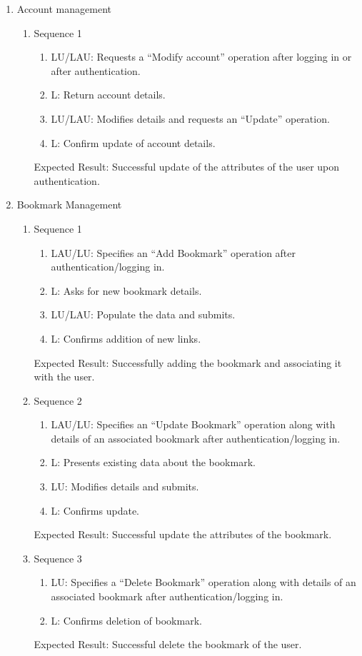 \documentclass[11pt]{report} %
\begin{document}
\begin{enumerate}
\item
	Account management
		\begin{enumerate}
			\item
				Sequence 1
					\begin{enumerate}
						\item
							LU/LAU: Requests a “Modify account” operation after logging in or after authentication.
						\item
							L: Return account details.
						\item
							LU/LAU: Modifies details and requests an “Update” operation.
						\item
							L: Confirm update of account details.						

					\end{enumerate}	
				Expected Result: Successful update of the attributes of the user upon authentication.							
		\end{enumerate}

\item
	Bookmark Management
		\begin{enumerate}
			\item
				Sequence 1
					\begin{enumerate}
						\item
							LAU/LU: Specifies an ``Add Bookmark'' operation after authentication/logging in.
						\item
							L: Asks for new bookmark details.
						\item
							LU/LAU: Populate the data and submits.
						\item
							L: Confirms addition of new links.
					\end{enumerate}
				Expected Result: Successfully adding the bookmark and associating it with the user.					
			\item
				Sequence 2
					\begin{enumerate}
						\item
							LAU/LU: Specifies an “Update Bookmark” operation along with details of an associated bookmark after authentication/logging in.
						\item
							L: Presents existing data about the bookmark.
						\item
							LU: Modifies details and submits.
						\item
							L: Confirms update.
					\end{enumerate}
				Expected Result: Successful update the attributes of the bookmark.					
			\item
				Sequence 3
					\begin{enumerate}
						\item
							LU: Specifies a “Delete Bookmark” operation along with details of an associated bookmark after authentication/logging in.
						\item
							L: Confirms deletion of bookmark.
					\end{enumerate}
				Expected Result: Successful delete the bookmark of the user.					
		\end{enumerate}


\end{enumerate}
\end{document}
